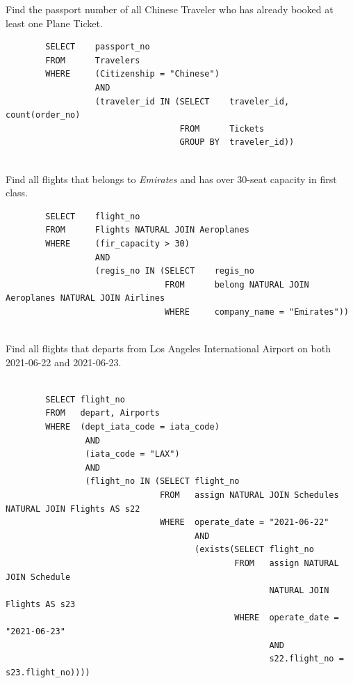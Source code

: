 \documentclass{article}
\begin{document}
	Find the passport number of all Chinese Traveler who has already booked at least one Plane Ticket. 
	\begin{verbatim}
		SELECT    passport_no 
		FROM      Travelers
		WHERE     (Citizenship = "Chinese") 
		          AND 
		          (traveler_id IN (SELECT    traveler_id, count(order_no)
		                           FROM      Tickets
		                           GROUP BY  traveler_id))
		
	\end{verbatim}
	Find all flights that belongs to \textit{Emirates} and has over 30-seat capacity in first class. 
	\begin{verbatim}
		SELECT    flight_no
		FROM      Flights NATURAL JOIN Aeroplanes
		WHERE     (fir_capacity > 30) 
		          AND
		          (regis_no IN (SELECT    regis_no
		                        FROM      belong NATURAL JOIN Aeroplanes NATURAL JOIN Airlines
		                        WHERE     company_name = "Emirates"))
		                        
	\end{verbatim}
	Find all flights that departs from Los Angeles International Airport on both 2021-06-22 and 2021-06-23.
	\begin{verbatim}
		
		SELECT flight_no
		FROM   depart, Airports
		WHERE  (dept_iata_code = iata_code)
		        AND
		        (iata_code = "LAX")
		        AND 
		        (flight_no IN (SELECT flight_no
		                       FROM   assign NATURAL JOIN Schedules NATURAL JOIN Flights AS s22
		                       WHERE  operate_date = "2021-06-22" 
		                              AND 
		                              (exists(SELECT flight_no
		                                      FROM   assign NATURAL JOIN Schedule 
		                                             NATURAL JOIN Flights AS s23
		                                      WHERE  operate_date = "2021-06-23" 
		                                             AND
		                                             s22.flight_no = s23.flight_no))))
		          
	\end{verbatim}
	
	
	
	
	
	
	
	
	
	
\end{document}
